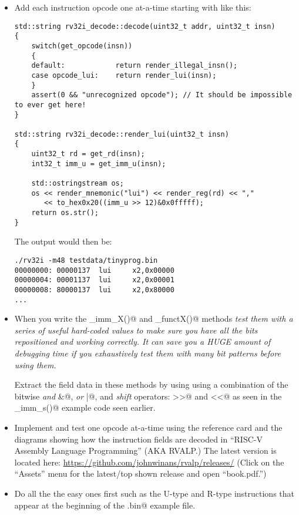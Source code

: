 \documentclass[11pt]{article}
\begin{document}
\begin{itemize}
\item
Add each instruction opcode one at-a-time starting with \verb@lui@ like this:

{\small
\begin{verbatim}
std::string rv32i_decode::decode(uint32_t addr, uint32_t insn)
{
    switch(get_opcode(insn))
    {
    default:            return render_illegal_insn();
    case opcode_lui:    return render_lui(insn);
    }
    assert(0 && "unrecognized opcode"); // It should be impossible to ever get here!
}

std::string rv32i_decode::render_lui(uint32_t insn)
{
    uint32_t rd = get_rd(insn);
    int32_t imm_u = get_imm_u(insn);

    std::ostringstream os;
    os << render_mnemonic("lui") << render_reg(rd) << "," 
       << to_hex0x20((imm_u >> 12)&0x0fffff);
    return os.str();
}
\end{verbatim}
}

The output would then be:

{\small
\begin{verbatim}
./rv32i -m48 testdata/tinyprog.bin
00000000: 00000137  lui     x2,0x00000
00000004: 00001137  lui     x2,0x00001
00000008: 80000137  lui     x2,0x80000
...
\end{verbatim}
}


\item
When you write the \verb@get_imm_X()@ and \verb@get_functX()@ 
methods {\em test them with a series of useful hard-coded values to make sure you 
have all the bits repositioned and working correctly. It can save you a
HUGE amount of debugging time if you exhaustively test them with many bit 
patterns before using them.}

Extract the field data in these methods by using using a combination of 
the bitwise {\em and} \verb@&@, {\em or} \verb@|@, 
and {\em shift} operators: \verb@>>@ and \verb@<<@
as seen in the \verb@get_imm_s()@ example code seen earlier.

\item
Implement and test one opcode at-a-time using 
the reference card and the diagrams showing how the instruction fields
are decoded in ``RISC-V Assembly Language Programming'' (AKA RVALP.) 
The latest version is located here: 
\url{https://github.com/johnwinans/rvalp/releases/} (Click on the 
``Assets'' menu for the latest/top shown release and open ``book.pdf.'')


\item
Do all the the easy ones first such as the U-type and R-type instructions 
that appear at the beginning of the \verb@tinyprog.bin@ example file. 


\end{itemize}
\end{document}
